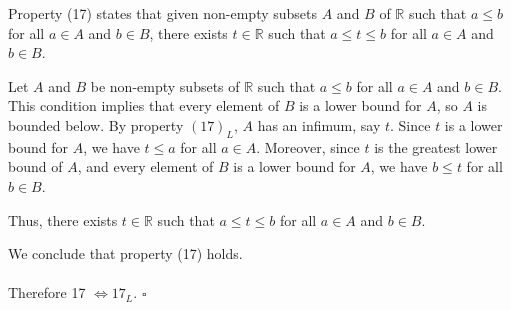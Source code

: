 \documentclass[11pt]{article}
\begin{document}
\noindent Property (17) states that given non-empty subsets $A$ and $B$ of $\mathbb{R}$ such that $a \leq b$ for all $a \in A$ and $b \in B$, there exists $t \in \mathbb{R}$ such that $a \leq t \leq b$ for all $a \in A$ and $b \in B$.

\noindent Let $A$ and $B$ be non-empty subsets of $\mathbb{R}$ such that $a \leq b$ for all $a \in A$ and $b \in B$. This condition implies that every element of $B$ is a lower bound for $A$, so $A$ is bounded below. By property $(17)_L$, $A$ has an infimum, say $t$. Since $t$ is a lower bound for $A$, we have $t \leq a$ for all $a \in A$. Moreover, since $t$ is the greatest lower bound of $A$, and every element of $B$ is a lower bound for $A$, we have $b \leq t$ for all $b \in B$.

\noindent Thus, there exists $t \in \mathbb{R}$ such that $a \leq t \leq b$ for all $a \in A$ and $b \in B$.

\noindent We conclude that property (17) holds.
~\\
~\\
\noindent Therefore 17 $\iff 17_L$. \noindent $\square$
\end{document}
